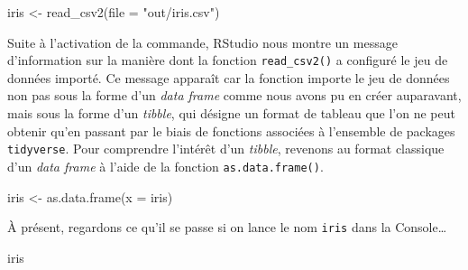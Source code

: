 \documentclass[
]{book}
\newenvironment{Shaded}{\begin{snugshade}}{\end{snugshade}}
\newcommand{\AttributeTok}[1]{\textcolor[rgb]{0.77,0.63,0.00}{#1}}
\newcommand{\FunctionTok}[1]{\textcolor[rgb]{0.00,0.00,0.00}{#1}}
\newcommand{\NormalTok}[1]{#1}
\newcommand{\OtherTok}[1]{\textcolor[rgb]{0.56,0.35,0.01}{#1}}
\newcommand{\StringTok}[1]{\textcolor[rgb]{0.31,0.60,0.02}{#1}}
\begin{document}
\begin{Shaded}
\begin{Highlighting}[]
\NormalTok{iris }\OtherTok{\textless{}{-}} \FunctionTok{read\_csv2}\NormalTok{(}\AttributeTok{file =} \StringTok{"out/iris.csv"}\NormalTok{)}
\end{Highlighting}
\end{Shaded}

Suite à l'activation de la commande, RStudio nous montre un message d'information sur la manière dont la fonction \texttt{read\_csv2()} a configuré le jeu de données importé. Ce message apparaît car la fonction importe le jeu de données non pas sous la forme d'un \emph{data frame} comme nous avons pu en créer auparavant, mais sous la forme d'un \emph{tibble}, qui désigne un format de tableau que l'on ne peut obtenir qu'en passant par le biais de fonctions associées à l'ensemble de packages \texttt{tidyverse}. Pour comprendre l'intérêt d'un \emph{tibble}, revenons au format classique d'un \emph{data frame} à l'aide de la fonction \texttt{as.data.frame()}.

\begin{Shaded}
\begin{Highlighting}[]
\NormalTok{iris }\OtherTok{\textless{}{-}} \FunctionTok{as.data.frame}\NormalTok{(}\AttributeTok{x =}\NormalTok{ iris)}
\end{Highlighting}
\end{Shaded}

À présent, regardons ce qu'il se passe si on lance le nom \texttt{iris} dans la Console\ldots{}

\begin{Shaded}
\begin{Highlighting}[]
\NormalTok{iris}
\end{Highlighting}
\end{Shaded}
\end{document}
